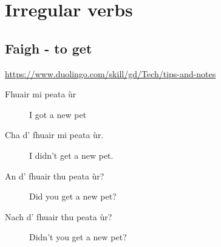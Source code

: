 
\chapter{Irregular verbs}

\section{Faigh - to get}

\url{https://www.duolingo.com/skill/gd/Tech/tips-and-notes}

\begin{description}
\item[Fhuair mi peata \`{u}r] I got a new pet
\item[Cha d' fhuair mi peata \`{u}r.] I didn't get a new pet.
\item[An d' fhuair thu peata \`{u}r?] Did you get a new pet?
\item[Nach d' fhuair thu peata \`{u}r?] Didn't you get a new pet?
\end{description}


